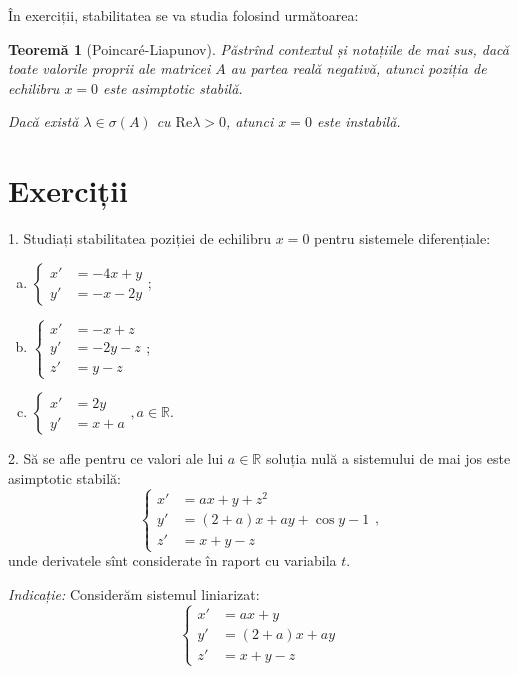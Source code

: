 \documentclass[11pt,a4paper]{article}
\newcommand\RR{\mathbb{R}}
\theoremstyle{dotless}
\newtheorem{theorem}{Teorem\u{a}}[section]
\theoremstyle{dotlessdr}
\begin{document}
În exerciții, stabilitatea se va studia folosind următoarea:

\begin{theorem}[Poincar\'{e}-Liapunov]\label{thm:stab-pl}
  Păstrînd contextul și notațiile de mai sus, dacă toate valorile proprii ale
  matricei $A$ au partea reală negativă, atunci poziția de echilibru $x = 0$ este
  asimptotic stabilă.

  Dacă există $\lambda \in \sigma(A)$ cu $\mathrm{Re}\lambda > 0$, atunci $x = 0$
  este instabilă.
\end{theorem}


\section{Exerciții}

1. Studiați stabilitatea poziției de echilibru $x = 0$ pentru sistemele diferențiale:
\begin{enumerate}[(a)]
\item $\begin{cases}
    x' &= -4x + y \\
    y' &= -x - 2y
  \end{cases}$;
\item $\begin{cases}
    x' &= -x + z \\
    y' &= -2y - z \\
    z' &= y - z
  \end{cases}$;
\item $\begin{cases}
    x' &= 2y \\
    y' &= x + a
  \end{cases}, a \in \RR$.
\end{enumerate}

\vspace{1cm}

2. Să se afle pentru ce valori ale lui $a \in \RR$ soluția nulă a sistemului
de mai jos este asimptotic stabilă:
\[
  \begin{cases}
    x' &= ax + y + z^2 \\
    y' &= (2 + a)x + ay + \cos y - 1 \\
    z' &= x + y - z
  \end{cases},
\]
unde derivatele sînt considerate în raport cu variabila $t$.

\emph{Indicație:} Considerăm sistemul liniarizat:
\[
  \begin{cases}
    x' &= ax + y \\
    y' &= (2 + a)x + ay \\
    z' &= x + y - z
  \end{cases}
\]
\end{document}
